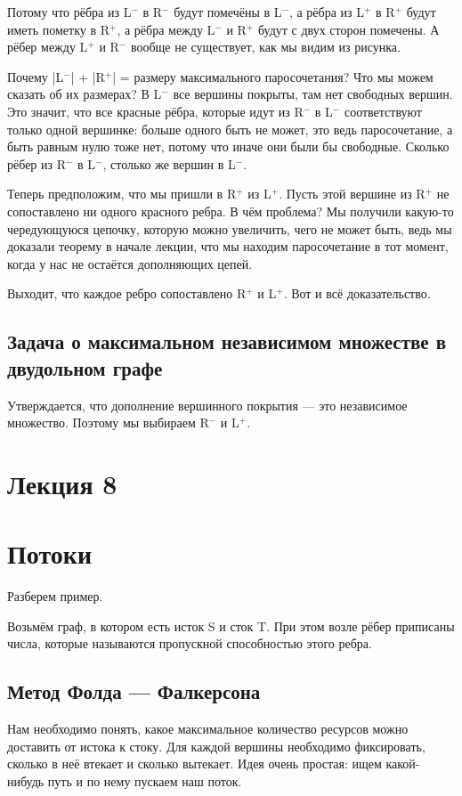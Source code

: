 \documentclass[12pt]{article}
\begin{document}
Потому что рёбра из L$^{-}$ в R$^{-}$ будут помечёны в L$^{-}$, а рёбра из L$^{+}$ в R$^{+}$ будут иметь пометку в R$^{+}$, а рёбра между L$^{-}$ и R$^{+}$ будут с двух сторон помечены. А рёбер между L$^{+}$ и R$^{-}$ вообще не существует, как мы видим из рисунка.

Почему |L$^{-}$| + |R$^{+}$| = размеру максимального паросочетания? Что мы можем сказать об их размерах? В L$^{-}$ все вершины покрыты, там нет свободных вершин. Это значит, что все красные рёбра, которые идут из R$^{-}$ в L$^{-}$ соответствуют только одной вершинке: больше одного быть не может, это ведь паросочетание, а быть равным нулю тоже нет, потому что иначе они были бы свободные. Сколько рёбер из R$^{-}$ в L$^{-}$, столько же вершин в L$^{-}$.

Теперь предположим, что мы пришли в R$^{+}$ из L$^{+}$. Пусть этой вершине из R$^{+}$ не сопоставлено ни одного красного ребра. В чём проблема? Мы получили какую-то чередующуюся цепочку, которую можно увеличить, чего не может быть, ведь мы доказали теорему в начале лекции, что мы находим паросочетание в тот момент, когда у нас не остаётся дополняющих цепей.

Выходит, что каждое ребро сопоставлено R$^{+}$ и L$^{+}$. Вот и всё доказательство.

\subsection*{Задача о максимальном независимом множестве в двудольном графе}
Утверждается, что дополнение вершинного покрытия --- это независимое множество. Поэтому мы выбираем R$^{-}$ и L$^{+}$.

\newpage
\section*{Лекция 8}
\section*{Потоки}
Разберем пример.

Возьмём граф, в котором есть исток S и сток T. При этом возле рёбер приписаны числа, которые называются пропускной способностью этого ребра.

\subsection*{Метод Фолда --- Фалкерсона}
Нам необходимо понять, какое максимальное количество ресурсов можно доставить от истока к стоку. Для каждой вершины необходимо фиксировать, сколько в неё втекает и сколько вытекает. Идея очень простая: ищем какой-нибудь путь и по нему пускаем наш поток.
\end{document}

